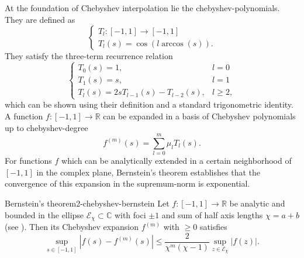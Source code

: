 At the foundation of Chebyshev interpolation lie the \glspl{chebyshev-polynomial}.
They are defined as \cite[chapter~3]{trefethen2019chebyshev}
\begin{equation}
    \begin{cases}
        T_l: [-1, 1] \to [-1, 1] \\
        T_l(s) = \cos(l \arccos(s)).
    \end{cases}
    \label{equ:2-chebyshev-chebyshev-definition}
\end{equation}
They satisfy the three-term recurrence relation
\begin{equation}
    \begin{cases}
        T_0(s) = 1, & l = 0 \\
        T_1(s) = s, & l = 1 \\
        T_{l}(s) = 2s T_{l-1}(s) - T_{l-2}(s), & l \geq 2,
    \end{cases}
    \label{equ:2-chebyshev-chebyshev-recursion}
\end{equation}
which can be shown using their definition 
and a standard trigonometric identity.\\

A function $f:[-1, 1] \to \mathbb{R}$ can be expanded in a basis of Chebyshev
polynomials up to \gls{chebyshev-degree} \cite[chapter~3]{trefethen2019chebyshev}
\begin{equation}
    f^{(m)}(s) = \sum_{l=0}^{m} \mu_l T_l(s).
    \label{equ:2-chebyshev-chebyshev-expansion-general}
\end{equation}
For functions $f$ which can be analytically extended in a certain neighborhood
of $[-1, 1]$ in the complex plane, Bernstein's theorem \cite[theorem~4.3]{trefethen2008gauss}
establishes that the convergence of this expansion in the supremum-norm is
exponential.
\begin{theorem}{Bernstein's theorem}{2-chebyshev-bernstein}
    Let $f:[-1, 1] \to \mathbb{R}$ be analytic and bounded in the ellipse $\mathcal{E}_{\chi} \subset \mathbb{C}$
    with foci $\pm 1$ and sum of half axis lengths $\chi = a + b$ (see ).
    Then its Chebyshev expansion $f^{(m)}$ with  $\geq 0$ satisfies
    \begin{equation}
        \sup_{s \in [-1, 1]} |f(s) - f^{(m)}(s)| \leq \frac{2}{\chi^{m}(\chi-1)} \sup_{z \in \mathcal{E}_{\chi}} |f(z)|.
        \label{equ:2-chebyshev-bernstein-convergence-result}
    \end{equation}
\end{theorem}

